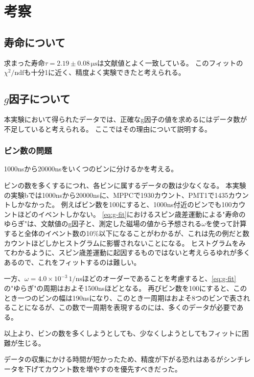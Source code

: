 \section{考察}
\subsection{寿命について}
求まった寿命$\tau= 2.19 \pm 0.08\,\mathrm{\mu s}$は文献値とよく一致している。
このフィットの$\chi^2 / \mathrm{ndf}$も十分1に近く、精度よく実験できたと考えられる。

\subsection{$g$因子について}
本実験において得られたデータでは、正確なg因子の値を求めるにはデータ数が不足していると考えられる。
ここではその理由について説明する。
\subsubsection{ビン数の問題}
1000nsから20000nsをいくつのビンに分けるかを考える。

ビンの数を多くするにつれ、各ビンに属するデータの数は少なくなる。
本実験の実験bでは1000nsから20000nsに、MPPCで1930カウント、PMT1で1435カウントしかなかった。
例えばビン数を100にすると、1000ns付近のビンでも100カウントほどのイベントしかない。
\ref{eq:g-fit}におけるスピン歳差運動による"寿命のゆらぎ"は、文献値のg因子と、測定した磁場の値から予想される$\omega$を使って計算すると全体のイベント数の10\%以下になることがわかるが、これは先の例だと数カウントほどしかヒストグラムに影響されないことになる。
ヒストグラムをみてわかるように、スピン歳差運動に起因するものではないと考えらるゆれが多くあるので、これをフィットするのは難しい。

一方、$\omega = 4.0 \times 10^{-3}\,\mathrm{1/ns}$ほどのオーダーであることを考慮すると、\ref{eq:g-fit}の"ゆらぎ"の周期はおよそ1500nsほどとなる。
再びビン数を100にすると、このとき一つのビンの幅は190nsになり、このとき一周期はおよそ8つのビンで表されることになるが、この数で一周期を表現するのには、多くのデータが必要である。

以上より、ビンの数を多くしようとしても、少なくしようとしてもフィットに困難が生じる。

データの収集にかける時間が短かったため、精度が下がる恐れはあるがシンチレータを下げてカウント数を増やすのを優先すべきだった。

